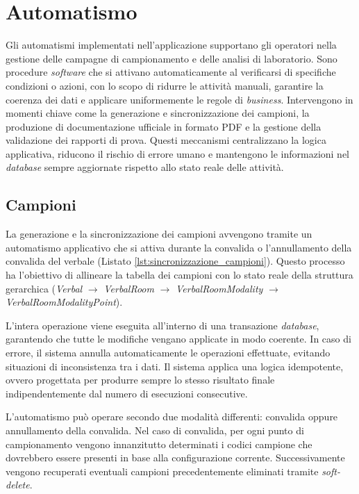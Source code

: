 \section{Automatismo}
Gli automatismi implementati nell'applicazione supportano gli operatori nella gestione delle campagne di campionamento e delle analisi di laboratorio. Sono procedure \textit{software} che si attivano automaticamente al verificarsi di specifiche condizioni o azioni, con lo scopo di ridurre le attività manuali, garantire la coerenza dei dati e applicare uniformemente le regole di \textit{business}. Intervengono in momenti chiave come la generazione e sincronizzazione dei campioni, la produzione di documentazione ufficiale in formato PDF e la gestione della validazione dei rapporti di prova. Questi meccanismi centralizzano la logica applicativa, riducono il rischio di errore umano e mantengono le informazioni nel \textit{database} sempre aggiornate rispetto allo stato reale delle attività.

\subsection{Campioni}
La generazione e la sincronizzazione dei campioni avvengono tramite un automatismo applicativo che si attiva durante la convalida o l'annullamento della convalida del verbale (Listato \ref{lst:sincronizzazione_campioni}). Questo processo ha l'obiettivo di allineare la tabella dei campioni con lo stato reale della struttura gerarchica (\textit{Verbal} $\rightarrow$ \textit{VerbalRoom} $\rightarrow$ \textit{VerbalRoomModality} $\rightarrow$ \textit{VerbalRoomModalityPoint}). 

L'intera operazione viene eseguita all'interno di una transazione \textit{database}, garantendo che tutte le modifiche vengano applicate in modo coerente. In caso di errore, il sistema annulla automaticamente le operazioni effettuate, evitando situazioni di inconsistenza tra i dati. Il sistema applica una logica idempotente, ovvero progettata per produrre sempre lo stesso risultato finale indipendentemente dal numero di esecuzioni consecutive. 

L'automatismo può operare secondo due modalità differenti: convalida oppure annullamento della convalida. Nel caso di convalida, per ogni punto di campionamento vengono innanzitutto determinati i codici campione che dovrebbero essere presenti in base alla configurazione corrente. Successivamente vengono recuperati eventuali campioni precedentemente eliminati tramite \textit{soft-delete}. 

